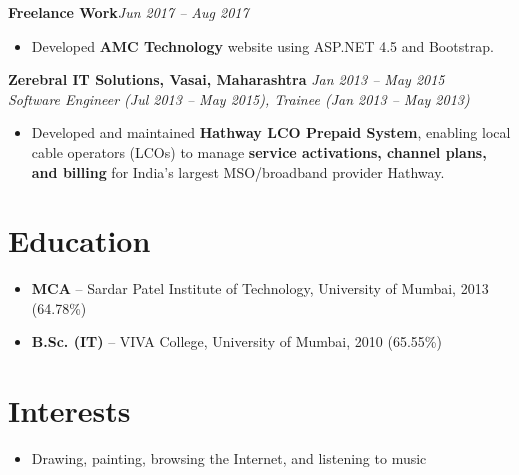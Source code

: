 \documentclass[12pt,a4paper]{article}
\begin{document}
\textbf{Freelance Work\hfill }\textit{Jun 2017 -- Aug 2017}\textbf{}
\begin{itemize}
    \item Developed \textbf{AMC Technology} website using ASP.NET 4.5 and Bootstrap.\textbf{\\}
\end{itemize}

\textbf{Zerebral IT Solutions, Vasai, Maharashtra} \hfill \textit{Jan 2013 -- May 2015}\\
\textit{Software Engineer (Jul 2013 -- May 2015), \newline Trainee (Jan 2013 -- May 2013)}
\begin{itemize}
    \item Developed and maintained \textbf{Hathway LCO Prepaid System}, enabling local cable operators (LCOs) to manage \textbf{service activations, channel plans, and billing} for India's largest MSO/broadband provider Hathway.
\end{itemize}

\section*{Education}
\begin{itemize}
    \item \textbf{MCA} -- Sardar Patel Institute of Technology,  University of Mumbai, 2013 \quad (64.78\%)
    \item \textbf{B.Sc. (IT)} -- VIVA College, University of Mumbai, 2010 \quad (65.55\%)
\end{itemize}
\section*{Interests}
\begin{itemize}
    \item Drawing, painting, browsing the Internet, and listening to music
\end{itemize}
\vspace{16pt}
\end{document}
